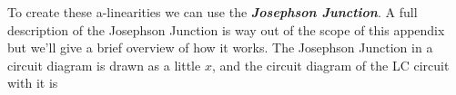 \documentclass[english, a4paper, 12pt, twoside]{article}
\numberwithin{equation}{section} %
\begin{document}
To create these a-linearities we can use the \textbf{\textit{Josephson Junction}}. A full description of the Josephson Junction is way out of the scope of this appendix but we'll give a brief overview of how it works. The Josephson Junction in a circuit diagram is drawn as a little $x$, and the circuit diagram of the LC circuit with it is




\end{document}
